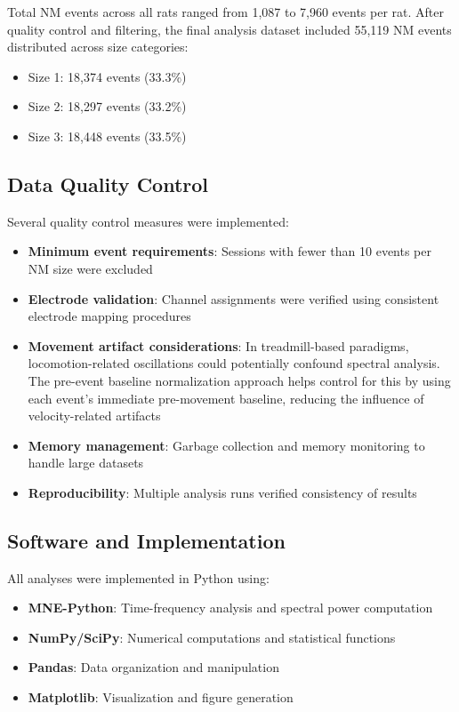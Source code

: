 \documentclass[11pt]{article}
\begin{document}
Total NM events across all rats ranged from 1,087 to 7,960 events per rat. After quality control and filtering, the final analysis dataset included 55,119 NM events distributed across size categories:
\begin{itemize}
\item Size 1: 18,374 events (33.3\%)
\item Size 2: 18,297 events (33.2\%)
\item Size 3: 18,448 events (33.5\%)
\end{itemize}

\subsection{Data Quality Control}

Several quality control measures were implemented:

\begin{itemize}
\item \textbf{Minimum event requirements}: Sessions with fewer than 10 events per NM size were excluded
\item \textbf{Electrode validation}: Channel assignments were verified using consistent electrode mapping procedures
\item \textbf{Movement artifact considerations}: In treadmill-based paradigms, locomotion-related oscillations could potentially confound spectral analysis. The pre-event baseline normalization approach helps control for this by using each event's immediate pre-movement baseline, reducing the influence of velocity-related artifacts
\item \textbf{Memory management}: Garbage collection and memory monitoring to handle large datasets
\item \textbf{Reproducibility}: Multiple analysis runs verified consistency of results
\end{itemize}

\subsection{Software and Implementation}

All analyses were implemented in Python using:
\begin{itemize}
\item \textbf{MNE-Python}: Time-frequency analysis and spectral power computation
\item \textbf{NumPy/SciPy}: Numerical computations and statistical functions
\item \textbf{Pandas}: Data organization and manipulation
\item \textbf{Matplotlib}: Visualization and figure generation
\end{itemize}
\end{document}
